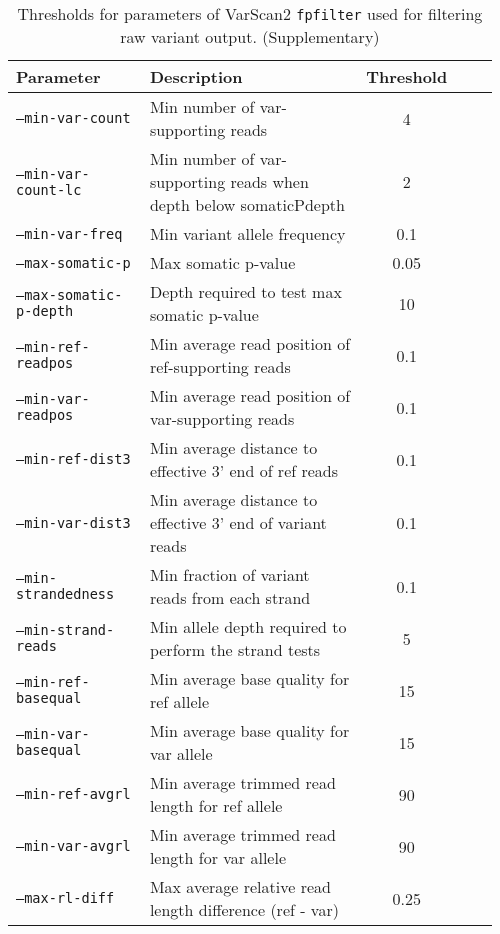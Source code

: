 \documentclass{bmcart}
\begin{document}
\begin{backmatter}
\begin{table}[H]
\caption{Thresholds for parameters of VarScan2 \texttt{fpfilter} used for filtering raw variant output. (Supplementary)}
\label{varscan_fpfilter_parameters}
\centering
      \begin{tabular}{p{0.3\linewidth}p{0.56\linewidth}cp{0.1\linewidth}}
        \hline
        Parameter & Description & Threshold
				\\
				\hline
				\texttt{--min-var-count} & Min number of var-supporting reads & 4
				\\
        \texttt{--min-var-count-lc} & Min number of var-supporting reads when depth below somaticPdepth & 2
        \\
        \texttt{--min-var-freq} & Min variant allele frequency & 0.1
				\\
        \texttt{--max-somatic-p} & Max somatic p-value & 0.05
				\\
        \texttt{--max-somatic-p-depth} & Depth required to test max somatic p-value & 10
				\\
        \texttt{--min-ref-readpos} & Min average read position of ref-supporting reads & 0.1
				\\
        \texttt{--min-var-readpos} & Min average read position of var-supporting reads & 0.1
				\\
        \texttt{--min-ref-dist3} & Min average distance to effective 3' end of ref reads & 0.1
				\\
        \texttt{--min-var-dist3} & Min average distance to effective 3' end of variant reads & 0.1
				\\
        \texttt{--min-strandedness} & Min fraction of variant reads from each strand & 0.1
				\\
        \texttt{--min-strand-reads} & Min allele depth required to perform the strand tests & 5
				\\
        \texttt{--min-ref-basequal} & Min average base quality for ref allele & 15
				\\
        \texttt{--min-var-basequal} & Min average base quality for var allele & 15
				\\
        \texttt{--min-ref-avgrl} & Min average trimmed read length for ref allele & 90
				\\
        \texttt{--min-var-avgrl} & Min average trimmed read length for var allele & 90
        \\
        \texttt{--max-rl-diff} & Max average relative read length difference (ref - var) & 0.25

\end{tabular}
\end{table}
\end{backmatter}
\end{document}

